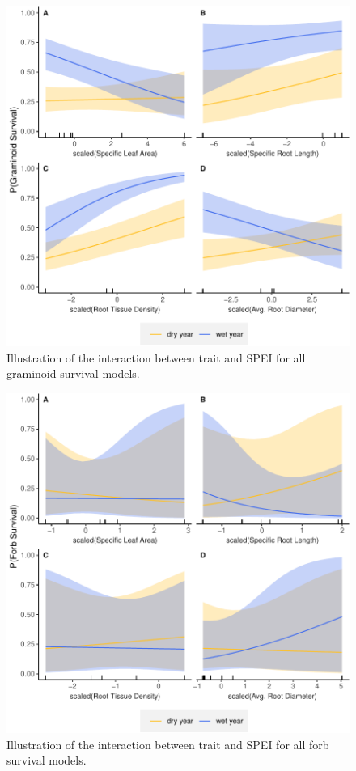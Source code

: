 \documentclass[12pt, letterpaper]{article}
\begin{document}
\begin{figure}
\includegraphics[width=.8\textwidth]{figures/supGramSurvPlots-1.pdf}
\caption{\small{
Illustration of the interaction between trait and SPEI for all graminoid survival models.
}}
\label{fig:GramSurv_all}
\end{figure}

\begin{figure}
\includegraphics[width=.8\textwidth]{figures/supForbSurvPlots-1.pdf}
\caption{\small{
Illustration of the interaction between trait and SPEI for all forb survival models.
}}
\label{fig:ForbSurv_all}
\end{figure}
\end{document}
